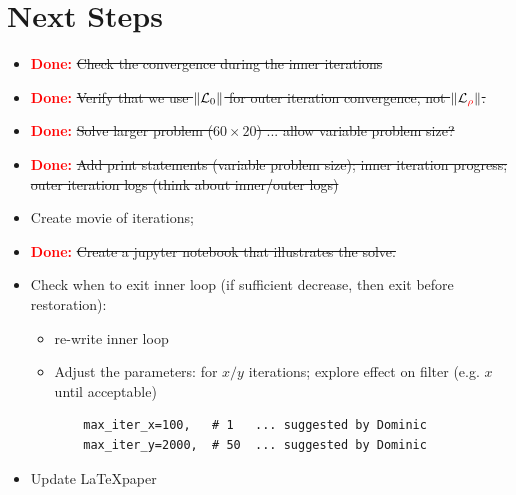 \documentclass[11pt]{article}
\begin{document}
\newpage
\appendix
\section{Next Steps}

\begin{itemize}
\item \textbf{\textcolor{red}{Done:}} \sout{Check the convergence during the inner iterations}
\item \textbf{\textcolor{red}{Done:}} \sout{Verify that we use $\| {\cal L}_0 \|$ for outer iteration convergence, not $\| {\cal L}_{\textcolor{red}{\rho}} \|$.}
\item \textbf{\textcolor{red}{Done:}} \sout{Solve larger problem ($60 \times 20$) ... allow variable problem size?}
\item  \textbf{\textcolor{red}{Done:}} \sout{Add print statements (variable problem size); inner iteration progress; outer iteration logs (think about inner/outer logs)}
\item Create movie of iterations; 
\item \textbf{\textcolor{red}{Done:}} \sout{Create a jupyter notebook that illustrates the solve.}
\item Check when to exit inner loop (if sufficient decrease, then exit before restoration):
  \begin{itemize}
    \item re-write inner loop
    \item Adjust the parameters: for $x/y$ iterations; explore effect on filter (e.g. $x$ until acceptable)
\begin{verbatim}
    max_iter_x=100,   # 1   ... suggested by Dominic
    max_iter_y=2000,  # 50  ... suggested by Dominic
\end{verbatim}
\end{itemize}
\item Update \LaTeX paper
\end{itemize}
\end{document}
